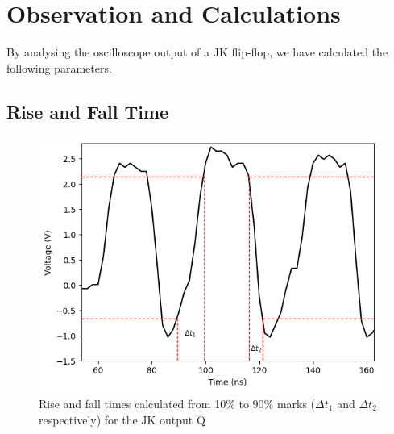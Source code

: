 \section{Observation and Calculations}
By analysing the oscilloscope output of a JK flip-flop, we have calculated the following parameters. 

\subsection*{Rise and Fall Time}

\begin{figure}[H]
    \centering
    \includegraphics[width=1\columnwidth]{images/risefall.png}
    \caption{Rise and fall times calculated from 10\% to 90\% marks ($\Delta t_1$ and $\Delta t_2$ respectively) for the JK output Q}
\end{figure}

